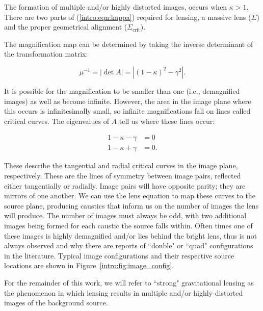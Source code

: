 \noindent The formation of multiple and/or highly distorted images, occurs when $\kappa>1$. There are two parts of (\ref{intro:eqn:kappa}) required for lensing, a massive lens ($\Sigma$) and the proper geometrical alignment ($\Sigma_\mathrm{crit}$).

The magnification map can be determined by taking the inverse determinant of the transformation matrix:

\begin{equation}
\mu^{-1} = |\det A| = |(1-\kappa)^2 - \gamma^2|.
\end{equation}

\noindent It is possible for the magnification to be smaller than one (i.e., demagnified images) as well as become infinite. However, the area in the image plane where this occurs is infinitesimally small, so infinite magnifications fall on lines called critical curves. The eigenvalues of $A$ tell us where these lines occur:

\begin{align}
1-\kappa-\gamma &= 0 \\
1-\kappa+\gamma &= 0.
\end{align}

\noindent These describe the tangential and radial critical curves in the image plane, respectively. These are the lines of symmetry between image pairs, reflected either tangentially or radially. Image pairs will have opposite parity; they are mirrors of one another. We can use the lens equation to map these curves to the source plane, producing caustics that inform us on the number of images the lens will produce. The number of images must always be odd, with two additional images being formed for each caustic the source falls within. Often times one of these images is highly demagnified and/or lies behind the bright lens, thus is not always observed and why there are reports of ``double" or ``quad" configurations in the literature. Typical image configurations and their respective source locations are shown in Figure~\ref{intro:fig:image_config}.

For the remainder of this work, we will refer to ``strong" gravitational lensing as the phenomenon in which lensing results in multiple and/or highly-distorted images of the background source.

